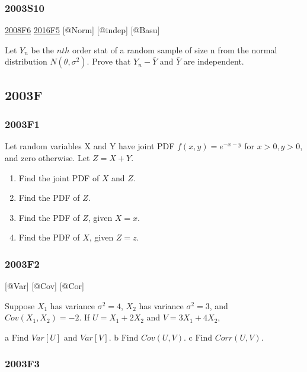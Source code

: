 \documentclass[6pt,twocolumn,Portrait]{article}
\begin{document}
\hypertarget{s10}{%
\subsubsection{2003S10}\label{s10}}

\protect\hyperlink{f6-3}{2008F6} \protect\hyperlink{f5-6}{2016F5}
{[}@Norm{]} {[}@indep{]} {[}@Basu{]}

Let \(Y_n\) be the \(n{th}\) order stat of a random sample of size n
from the normal distribution \(N(\theta,\sigma^2)\). Prove that
\(Y_n-\bar Y\) and \(\bar Y\) are independent.

\hypertarget{f-1}{%
\subsection{2003F}\label{f-1}}

\hypertarget{f1-1}{%
\subsubsection{2003F1}\label{f1-1}}

Let random variables X and Y have joint PDF \(f(x,y)=e^{-x-y}\) for
\(x>0, y>0\), and zero otherwise. Let \(Z=X+Y\).

\begin{enumerate}
\def\labelenumi{\Alph{enumi})}
\item
  Find the joint PDF of \(X\) and \(Z\).
\item
  Find the PDF of \(Z\).
\item
  Find the PDF of \(Z\), given \(X=x\).
\item
  Find the PDF of \(X\), given \(Z=z\).
\end{enumerate}

\hypertarget{f2-1}{%
\subsubsection{2003F2}\label{f2-1}}

{[}@Var{]} {[}@Cov{]} {[}@Cor{]}

Suppose \(X_1\) has variance \(\sigma^2=4\), \(X_2\) has variance
\(\sigma^2=3\), and \(Cov(X_1,X_2)=-2\). If \(U=X_1+2X_2\) and
\(V= 3X_1+4X_2\),

a Find \(Var[U]\) and \(Var[V]\). b Find \(Cov(U,V)\). c Find
\(Corr(U,V)\).

\hypertarget{f3-1}{%
\subsubsection{2003F3}\label{f3-1}}
\end{document}
